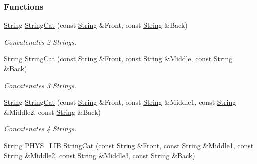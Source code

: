 \subsubsection*{Functions}
\begin{DoxyCompactItemize}
\item 
\hyperlink{namespacephys_aa03900411993de7fbfec4789bc1d392e}{String} \hyperlink{namespacephys_ae057253f75738c79bc5fdb5f1c5410de}{StringCat} (const \hyperlink{namespacephys_aa03900411993de7fbfec4789bc1d392e}{String} \&Front, const \hyperlink{namespacephys_aa03900411993de7fbfec4789bc1d392e}{String} \&Back)
\begin{DoxyCompactList}\small\item\em Concatenates 2 Strings. \item\end{DoxyCompactList}\item 
\hyperlink{namespacephys_aa03900411993de7fbfec4789bc1d392e}{String} \hyperlink{namespacephys_a63b5574e497344727dfb4e244511f2fb}{StringCat} (const \hyperlink{namespacephys_aa03900411993de7fbfec4789bc1d392e}{String} \&Front, const \hyperlink{namespacephys_aa03900411993de7fbfec4789bc1d392e}{String} \&Middle, const \hyperlink{namespacephys_aa03900411993de7fbfec4789bc1d392e}{String} \&Back)
\begin{DoxyCompactList}\small\item\em Concatenates 3 Strings. \item\end{DoxyCompactList}\item 
\hyperlink{namespacephys_aa03900411993de7fbfec4789bc1d392e}{String} \hyperlink{namespacephys_aa023584b6c0b8daa4b6abb9108d6e917}{StringCat} (const \hyperlink{namespacephys_aa03900411993de7fbfec4789bc1d392e}{String} \&Front, const \hyperlink{namespacephys_aa03900411993de7fbfec4789bc1d392e}{String} \&Middle1, const \hyperlink{namespacephys_aa03900411993de7fbfec4789bc1d392e}{String} \&Middle2, const \hyperlink{namespacephys_aa03900411993de7fbfec4789bc1d392e}{String} \&Back)
\begin{DoxyCompactList}\small\item\em Concatenates 4 Strings. \item\end{DoxyCompactList}\item 
\hyperlink{namespacephys_aa03900411993de7fbfec4789bc1d392e}{String} PHYS\_\-LIB \hyperlink{namespacephys_ae78c97cc3fea1bc4cb28ff77e98f4e71}{StringCat} (const \hyperlink{namespacephys_aa03900411993de7fbfec4789bc1d392e}{String} \&Front, const \hyperlink{namespacephys_aa03900411993de7fbfec4789bc1d392e}{String} \&Middle1, const \hyperlink{namespacephys_aa03900411993de7fbfec4789bc1d392e}{String} \&Middle2, const \hyperlink{namespacephys_aa03900411993de7fbfec4789bc1d392e}{String} \&Middle3, const \hyperlink{namespacephys_aa03900411993de7fbfec4789bc1d392e}{String} \&Back)

\end{DoxyCompactItemize}
